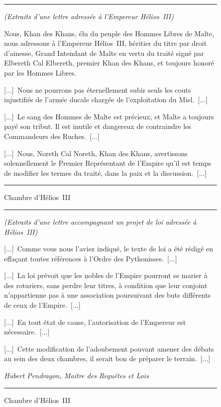 \documentclass{article}
\newcommand{\indice}[4]{
  \begin{figure}[H]
    \begin{center}
      \rule{0.5\textwidth}{1pt}
    \end{center}
    \begin{framed}
      \begin{samepage}
        \textit{#1}
        \nopagebreak

        #2

        \nopagebreak

        \hfill\textit{#3}
      \end{samepage}
    \end{framed}
    \caption{#4}
    \begin{center}
      \rule{0.5\textwidth}{1pt}
    \end{center}
  \end{figure}
}
\begin{document}
\indice
{(Extraits d'une lettre adressée à l'Empereur Hélios~III)}
{
    Nous, Khan des Khans, élu du peuple des Hommes Libres de Malte, nous
    adressons à l'Empereur Hélios~III, héritier du titre par droit d'ainesse,
    Grand Intendant de Malte en vertu du traité signé par Elbereth Cal
    Elbereth, premier Khan des Khans, et toujours honoré par les Hommes Libres.

    \nobreak

    [...]~Nous ne pourrons pas éternellement subir seuls les couts injustifiés
    de l'armée ducale chargée de l'exploitation du Miel.~[...]

    \nobreak

    [...]~Le sang des Hommes de Malte est précieux, et Malte a toujours payé
    son tribut. Il est inutile et dangereux de contraindre les Commandeurs des
    Ruches.~[...]

    \nobreak

    [...]~Nous, Noreth Cal Noreth, Khan des Khans, avertissons solennellement
    le Premier Représentant de l'Empire qu'il est temps de modifier les termes
    du traité, dans la paix et la discussion.~[...]
}{}
{Chambre d'Hélios~III}

\indice
{(Extraits d'une lettre accompagnant un projet de loi adressée à Hélios~III)}
{
    [...]~Comme vous nous l'aviez indiqué, le texte de loi a été rédigé en
    effaçant toutes références à l'Ordre des Pythonisses.~[...]

    \nobreak

    [...]~La loi prévoit que les nobles de l'Empire pourront se marier à des
    roturiers, sans perdre leur titres, à condition que leur conjoint
    n'appartienne pas à une association poursuivant des buts différents de ceux
    de l'Empire.~[...]

    \nobreak

    [...]~En tout état de cause, l'autorisation de l'Empereur est
    nécessaire.~[...]

    \nobreak

    [...]~Cette modification de l'adoubement pouvant amener des débats au sein
    des deux chambres, il serait bon de préparer le terrain.~[...]
}{Hubert Pendragon, Maitre des Requêtes et Lois}
{Chambre d'Hélios~III}
\end{document}
